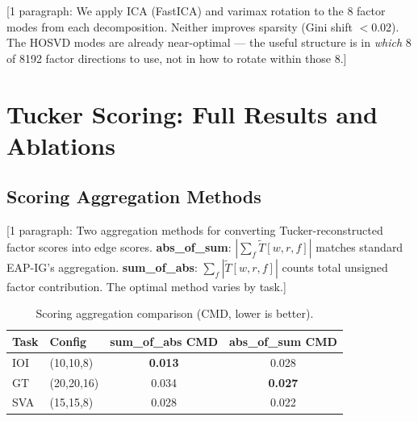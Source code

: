 \documentclass[11pt]{article}
\begin{document}
[1 paragraph: We apply ICA (FastICA) and varimax rotation to the 8 factor
modes from each decomposition. Neither improves sparsity (Gini shift
$<$0.02). The HOSVD modes are already near-optimal --- the useful
structure is in \emph{which} 8 of 8192 factor directions to use, not in
how to rotate within those 8.]



\section{Tucker Scoring: Full Results and Ablations}
\label{app:tucker_scoring}


\subsection{Scoring Aggregation Methods}
\label{app:tucker_scoring_agg}


[1 paragraph: Two aggregation methods for converting Tucker-reconstructed
factor scores into edge scores. \textbf{abs\_of\_sum}:
$|\sum_f \tilde{T}[w,r,f]|$ matches standard EAP-IG's aggregation.
\textbf{sum\_of\_abs}: $\sum_f |\tilde{T}[w,r,f]|$ counts total
unsigned factor contribution. The optimal method varies by task.]

\begin{table}[h]
\centering
\caption{Scoring aggregation comparison (CMD, lower is better).}
\label{tab:tucker_agg}
\begin{tabular}{llcc}
\toprule
\textbf{Task} & \textbf{Config} & \textbf{sum\_of\_abs CMD} & \textbf{abs\_of\_sum CMD} \\
\midrule
IOI & (10,10,8) & \textbf{0.013} & 0.028 \\
GT  & (20,20,16) & 0.034 & \textbf{0.027} \\
SVA & (15,15,8) & 0.028 & 0.022 \\
\bottomrule
\end{tabular}
\end{table}
\end{document}
